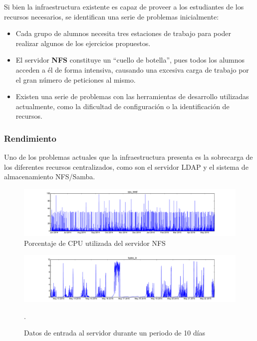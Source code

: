 Si bien la infraestructura existente es capaz de proveer a los estudiantes de los recursos necesarios, se identifican una serie de problemas inicialmente:

\begin{itemize}
  \item Cada grupo de alumnos necesita tres estaciones de trabajo para poder realizar algunos de los ejercicios propuestos.
  \item El servidor \textbf{NFS} constituye un ``cuello de botella'', pues todos los alumnos acceden a él de forma intensiva, causando una excesiva carga de trabajo por el gran número de peticiones al mismo.
  \item Existen una serie de problemas con las herramientas de desarrollo utilizadas actualmente, como la dificultad de configuración o la identificación de recursos.
\end{itemize}

\subsubsection{Rendimiento}
\label{dominio:estadisticas}
Uno de los problemas actuales que la infraestructura presenta es la sobrecarga de los diferentes recursos centralizados, como son el servidor LDAP y el sistema de almacenamiento NFS/Samba.

\begin{figure}[H]
\centering
\includegraphics[width=\textwidth]{Chapters/Chapter4/Figures/data/cpu_total-2014-05-23_21:27:50-2015-05-22_13:41:46}
\caption{Porcentaje de CPU utilizada del servidor NFS}
\end{figure}

\begin{figure}[H]
\centering
\includegraphics[width=\textwidth]{Chapters/Chapter4/Figures/data/bytes_in-2015-05-12_11:56:26-2015-05-22_12:51:08}
\caption{Datos de entrada al servidor durante un periodo de 10 días}.
\end{figure}

